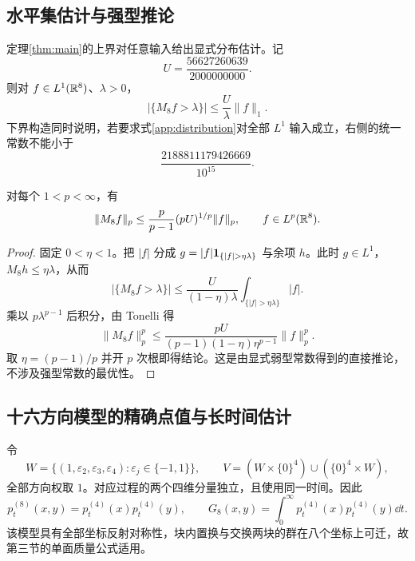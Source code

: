 \subsection{水平集估计与强型推论}
定理\ref{thm:main}的上界对任意输入给出显式分布估计。记
\[
 U=\frac{56627260639}{2000000000}.
\]
则对 $f\in L^1(\mathbb{R}^8)$、$\lambda>0$，
\begin{equation}\label{app:distribution}
 |\{M_8f>\lambda\}|\le \frac{U}{\lambda}\|f\|_1.
\end{equation}
下界构造同时说明，若要求式\eqref{app:distribution}对全部 $L^1$ 输入成立，右侧的统一常数不能小于
\[\frac{2188811179426669}{10^{15}}.\]

\begin{corollary}\label{app:Lp}
对每个 $1<p<\infty$，有
\[
 \|M_8f\|_p\le\frac{p}{p-1}(pU)^{1/p}\|f\|_p,
 \qquad f\in L^p(\mathbb{R}^8).
\]
\end{corollary}
\begin{proof}
固定 $0<\eta<1$。把 $|f|$ 分成
$g=|f|\ind_{\{|f|>\eta\lambda\}}$ 与余项 $h$。此时 $g\in L^1$，$M_8h\le\eta\lambda$，从而
\[
 |\{M_8f>\lambda\}|\le
 \frac{U}{(1-\eta)\lambda}\int_{\{|f|>\eta\lambda\}}|f|.
\]
乘以 $p\lambda^{p-1}$ 后积分，由 Tonelli 得
\[
 \|M_8f\|_p^p\le
 \frac{pU}{(p-1)(1-\eta)\eta^{p-1}}\|f\|_p^p.
\]
取 $\eta=(p-1)/p$ 并开 $p$ 次根即得结论。这是由显式弱型常数得到的直接推论，不涉及强型常数的最优性。
\end{proof}

\subsection{十六方向模型的精确点值与长时间估计}
令
\[
 W=\{(1,\varepsilon_2,\varepsilon_3,\varepsilon_4):
 \varepsilon_j\in\{-1,1\}\},\qquad
 V=(W\times\{0\}^4)\cup(\{0\}^4\times W),
\]
全部方向权取 $1$。对应过程的两个四维分量独立，且使用同一时间。因此
\[
 p_t^{(8)}(x,y)=p_t^{(4)}(x)p_t^{(4)}(y),\qquad
 G_8(x,y)=\int_0^\infty p_t^{(4)}(x)p_t^{(4)}(y)\dd t.
\]
该模型具有全部坐标反射对称性，块内置换与交换两块的群在八个坐标上可迁，故第三节的单面质量公式适用。

